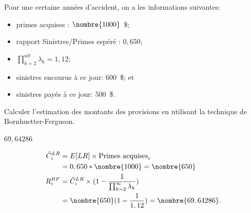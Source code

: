 \begin{exercice}
  Pour une certaine années d'accident, on a les informations
  suivantes:
  \begin{itemize}
  \item primes acquises : $\nombre{1000}$~\$;
  \item rapport Sinistres/Primes espéré : $0,650$;
  \item $\prod_{k=2}^{ult} \lambda_k = 1,12$;
  \item sinistres encourus à ce jour: $600$~\$; et
  \item sinistres payés à ce jour: $500$~\$.
  \end{itemize}
  Calculer l'estimation des montants des provisions en utilisant la
  technique de Bornhuetter-Ferguson.
  \begin{rep}
    $69,64286$
  \end{rep}
  \begin{sol}
    \begin{align*}
      \hat{C}_{i}^{LR} &= \Esp{LR} \times \text{Primes acquises}_i\\
                       &= 0,650 * \nombre{1000} = \nombre{650} \\
      R_i^{BF} &= \hat{C}_{i}^{LR} \times ( 1 - \frac{1}{\prod_{k=2}^{\infty} \lambda_k}) \\
                       &= \nombre{650} (1-\frac{1}{1,12}) = \nombre{69,64286}.
    \end{align*}
  \end{sol}
\end{exercice}


